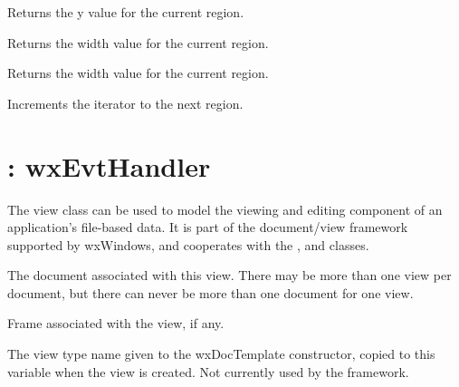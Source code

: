 

Returns the y value for the current region.



Returns the width value for the current region.



Returns the width value for the current region.



Increments the iterator to the next region.



\section{: wxEvtHandler}\label{wxview}


The view class can be used to model the viewing and editing component of
an application's file-based data. It is part of the document/view framework supported by wxWindows,
and cooperates with the , 
and  classes.



The document associated with this view. There may be more than one view per
document, but there can never be more than one document for one view.



Frame associated with the view, if any.



The view type name given to the wxDocTemplate constructor, copied to this
variable when the view is created. Not currently used by the framework.

